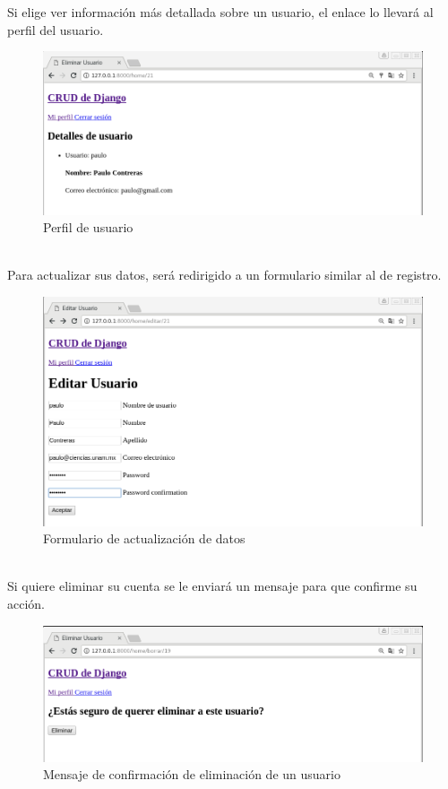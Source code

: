 \documentclass[9pt]{article}
\begin{document}
Si elige ver información más detallada sobre un usuario, el enlace lo llevará al perfil del usuario. \\
\begin{figure}[ht!]
  \centering
  \includegraphics[width=\textwidth]{django_crud/profile}
  \caption{Perfil de usuario}
\end{figure}
\\

Para actualizar sus datos, será redirigido a un formulario similar al de registro.\\
\begin{figure}[ht!]
  \centering
  \includegraphics[width=\textwidth]{django_crud/update}
  \caption{Formulario de actualización de datos}
\end{figure}
\\

Si quiere eliminar su cuenta se le enviará un mensaje para que confirme su acción. \\
\begin{figure}[ht!]
  \centering
  \includegraphics[width=\textwidth]{django_crud/delete}
  \caption{Mensaje de confirmación de eliminación de un usuario}
\end{figure}
\end{document}
